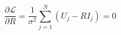 \documentclass[A4,11pt]{article}
\begin{document}
\thispagestyle{empty}
$$
\frac{\partial\mathcal{L}}{\partial R}    =  \frac{1}{\sigma^2}\sum\limits_{j=1}^N (U_j- R I_j) = 0 
$$
\end{document}
